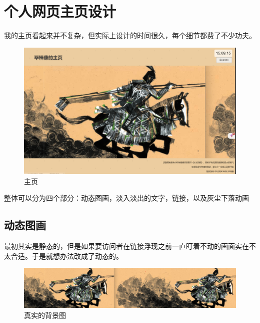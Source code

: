 \documentclass[supercite]{Experimental_Report}
\theoremstyle{definition}
\begin{document}
\newpage

\section{个人网页主页设计}
我的主页看起来并不复杂，但实际上设计的时间很久，每个细节都费了不少功夫。

\begin{figure}[htb] %
	\begin{center}
		\includegraphics[scale=0.40]{images/zhuye.png}
		\caption{主页}
		\label{fig2-1}
	\end{center}
\end{figure}

整体可以分为四个部分：动态图画，淡入淡出的文字，链接，以及灰尘下落动画

\subsection{动态图画}

最初其实是静态的，但是如果要访问者在链接浮现之前一直盯着不动的画面实在不太合适。于是就想办法改成了动态的。

\begin{figure}[htb] %
	\begin{center}
		\includegraphics[scale=0.40]{images/zhuye-1.png}
		\caption{真实的背景图}
		\label{fig2-2}
	\end{center}
\end{figure}
\end{document}
